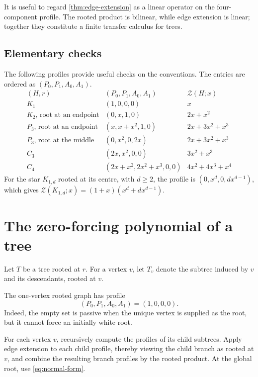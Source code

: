 \documentclass[11pt,reqno]{amsart}
\theoremstyle{definition}
\newcommand{\Zpoly}{\mathcal Z}
\begin{document}
It is useful to regard \cref{thm:edge-extension} as a linear operator on the four-component profile.  The rooted product is bilinear, while edge extension is linear; together they constitute a finite transfer calculus for trees.

\subsection{Elementary checks}\label{subsec:sanity}

The following profiles provide useful checks on the conventions.  The entries
are ordered as $(P_0,P_1,A_0,A_1)$.
\[
\begin{array}{c|c|c}
(H,r)&(P_0,P_1,A_0,A_1)&\Zpoly(H;x)\\
\hline
K_1&(1,0,0,0)&x\\
K_2\text{, root at an endpoint}&(0,x,1,0)&2x+x^2\\
P_3\text{, root at an endpoint}&(x,x+x^2,1,0)&2x+3x^2+x^3\\
P_3\text{, root at the middle}&(0,x^2,0,2x)&2x+3x^2+x^3\\
C_3&(2x,x^2,0,0)&3x^2+x^3\\
C_4&(2x+x^2,2x^2+x^3,0,0)&4x^2+4x^3+x^4
\end{array}
\]
For the star $K_{1,d}$ rooted at its centre, with $d\ge2$, the profile is
$(0,x^d,0,dx^{d-1})$, which gives
$\Zpoly(K_{1,d};x)=(1+x)(x^d+dx^{d-1})$.

\section{The zero-forcing polynomial of a tree}\label{sec:trees}

Let $T$ be a tree rooted at $r$.  For a vertex $v$, let $T_v$ denote the subtree induced by $v$ and its descendants, rooted at $v$.

The one-vertex rooted graph has profile
\begin{equation}\label{eq:singleton}
  (P_0,P_1,A_0,A_1)=(1,0,0,0).
\end{equation}
Indeed, the empty set is passive when the unique vertex is supplied as the root, but it cannot force an initially white root.

For each vertex $v$, recursively compute the profiles of its child subtrees.  Apply edge extension to each child profile, thereby viewing the child branch as rooted at $v$, and combine the resulting branch profiles by the rooted product.  At the global root, use \eqref{eq:normal-form}.
\end{document}
